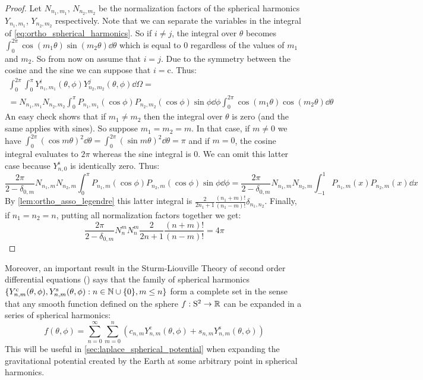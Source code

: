 \documentclass[../main.tex]{subfiles}
\begin{document}
\begin{proof}
  Let $N_{n_1,m_1}$, $N_{n_2,m_2}$ be the normalization factors of the spherical harmonics $Y_{n_1,m_1}$, $Y_{n_2,m_2}$ respectively. Note that we can separate the variables in the integral of \cref{eq:ortho_spherical_harmonics}. So if $i\ne j$, the integral over $\theta$ becomes $\int_0^{2\pi}\cos(m_1\theta)\sin(m_2\theta)\dd{\theta}$ which is equal to 0 regardless of the values of $m_1$ and $m_2$. So from now on assume that $i=j$. Due to the symmetry between the cosine and the sine we can suppose that $i=\mathrm{c}$. Thus:
  \begin{multline}
    \int_0^{2\pi}\int_0^\pi Y_{n_1,m_1}^i(\theta,\phi) Y_{n_2,m_2}^j(\theta,\phi)\dd\Omega=\\= N_{n_1,m_1}N_{n_2,m_2}\int_0^\pi P_{n_1,m_1}(\cos\phi) P_{n_2,m_2}(\cos\phi)\sin\phi\dd\phi\int_{0}^{2\pi}\cos(m_1\theta)\cos(m_2\theta)\dd{\theta}
  \end{multline}
  An easy check shows that if $m_1\neq m_2$ then the integral over $\theta$ is zero (and the same applies with sines). So suppose $m_1=m_2=m$. In that case, if $m\ne 0$ we have $\int_{0}^{2\pi}{(\cos m\theta)}^2\dd{\theta}=\int_{0}^{2\pi}{(\sin m\theta)}^2\dd{\theta}=\pi$ and if $m=0$, the cosine integral evaluates to $2\pi$ whereas the sine integral is 0. We can omit this latter case because $Y_{n,0}^{\mathrm{s}}$ is identically zero. Thus:
  \begin{equation}
    \frac{2\pi}{2-\delta_{0,m}} N_{n_1,m}N_{n_2,m}\int_0^\pi P_{n_1,m}(\cos\phi) P_{n_2,m}(\cos\phi)\sin\phi\dd\phi=\frac{2\pi}{2-\delta_{0,m}} N_{n_1,m}N_{n_2,m}\int_{-1}^1 P_{n_1,m}(x) P_{n_2,m}(x)\dd{x}
  \end{equation}
  By \cref{lem:ortho_asso_legendre} this latter integral is $\frac{2}{2n_1+1}\frac{(n_1+m)!}{(n_1-m)!} \delta_{n_1,n_2}$. Finally, if $n_1=n_2=n$, putting all normalization factors together we get:
  \begin{equation}
    \frac{2\pi}{2-\delta_{0,m}} N_{n}^{m}N_{n}^{m}\frac{2}{2n+1}\frac{(n+m)!}{(n-m)!}=4\pi
  \end{equation}
\end{proof}
Moreover, an important result in the Sturm-Liouville Theory of second order differential equations (\cite{wiki:sturmliouville,completenessSL}) says that the family of spherical harmonics $\{Y_{n,m}^{\mathrm{c}}(\theta,\phi),Y_{n,m}^{\mathrm{s}}(\theta,\phi):n\in\mathbb{N}\cup\{0\},m\leq n\}$ form a complete set in the sense that any smooth function defined on the sphere $f:\mathrm{S}^2\rightarrow\mathbb{R}$ can be expanded in a series of spherical harmonics:
\begin{equation}
  f(\theta,\phi)=\sum_{n=0}^\infty\sum_{m=0}^n (c_{n,m} Y_{n,m}^{\mathrm{c}}(\theta,\phi)+s_{n,m} Y_{n,m}^{\mathrm{s}}(\theta,\phi))
\end{equation}
This will be useful in \cref{sec:laplace_spherical_potential} when expanding the gravitational potential created by the Earth at some arbitrary point in spherical harmonics.
\end{document}
